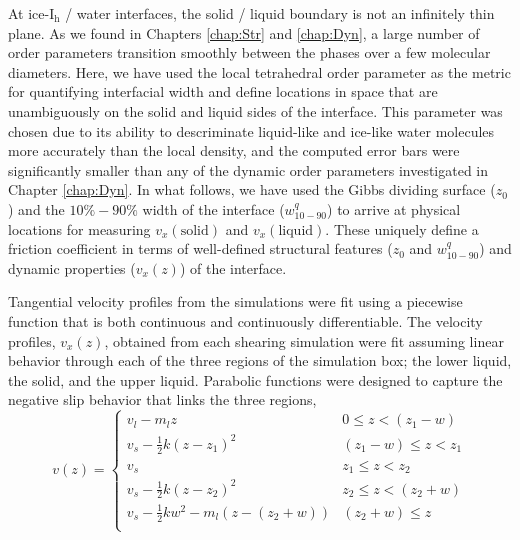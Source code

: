 At ice-I$_\mathrm{h}$ / water interfaces, the solid / liquid boundary
is not an infinitely thin plane. As we found in Chapters
\ref{chap:Str} and \ref{chap:Dyn}, a large number of order parameters
transition smoothly between the phases over a few molecular
diameters.  Here, we have used the local tetrahedral order parameter
as the metric for quantifying interfacial width and define locations
in space that are unambiguously on the solid and liquid sides of the
interface. This parameter was chosen due to its ability to
descriminate liquid-like and ice-like water molecules more accurately
than the local density, and the computed error bars were significantly
smaller than any of the dynamic order parameters investigated in
Chapter \ref{chap:Dyn}. In what follows, we have used the Gibbs
dividing surface ($z_0$) and the $10\%-90\%$ width of the interface
($w_\mathrm{10-90}^{q}$) to arrive at physical locations for measuring
$v_{x}(\mathrm{solid})$ and $v_{x}(\mathrm{liquid})$.  These uniquely
define a friction coefficient in terms of well-defined structural
features ($z_0$ and $w_\mathrm{10-90}^{q}$) and dynamic properties
($v_{x}(z)$) of the interface.

Tangential velocity profiles from the simulations were fit using a
piecewise function that is both continuous and continuously
differentiable. The velocity profiles, $v_x(z)$, obtained from each
shearing simulation were fit assuming linear behavior through each of
the three regions of the simulation box; the lower liquid, the solid,
and the upper liquid. Parabolic functions were designed to capture the
negative slip behavior that links the three regions,
\begin{equation}\label{eq:vfit}
v(z) =
\begin{cases}
  v_{l} - m_{l}z & 0 \leq z < (z_{1} - w) \\
  v_{s} - \frac{1}{2}k(z-z_{1})^{2} & (z_{1}-w) \leq z < z_{1} \\
  v_{s}  & z_{1} \leq z < z_{2} \\
  v_{s} - \frac{1}{2}k(z-z_{2})^{2}  & z_{2} \leq z <( z_{2} + w)\\
  v_{s} - \frac{1}{2}kw^{2} - m_{l}(z-(z_{2} + w)) & (z_{2} + w) \leq z \\
\end{cases}
\end{equation}
  
